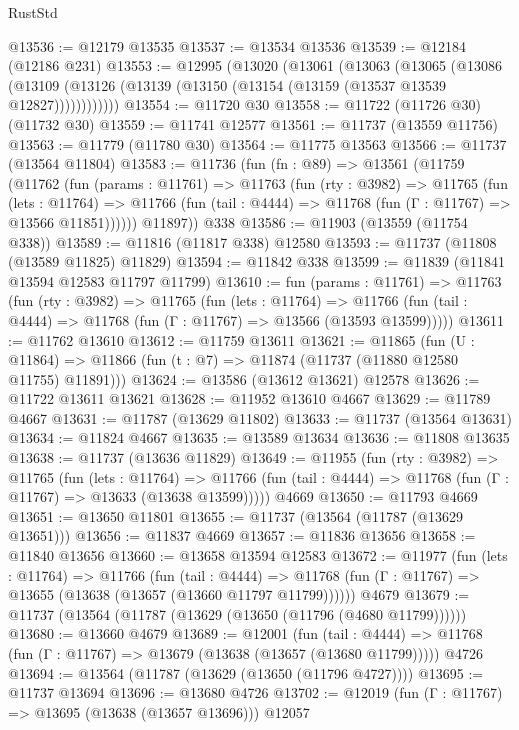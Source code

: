 \begin{lexlean}{RustStd}
\begin{coremodule}
@13536 := @12179 @13535
@13537 := @13534 @13536
@13539 := @12184 (@12186 @231)
@13553 := @12995
    (@13020
      (@13061
        (@13063
          (@13065
            (@13086
              (@13109 (@13126 (@13139 (@13150 (@13154 (@13159 (@13537 @13539 @12827))))))))))))
@13554 := @11720 @30
@13558 := @11722 (@11726 @30) (@11732 @30)
@13559 := @11741 @12577
@13561 := @11737 (@13559 @11756)
@13563 := @11779 (@11780 @30)
@13564 := @11775 @13563
@13566 := @11737 (@13564 @11804)
@13583 := @11736
    (fun (fn : @89) =>
    @13561
      (@11759
        (@11762
          (fun (params : @11761) =>
          @11763
            (fun (rty : @3982) =>
            @11765
              (fun (lets : @11764) =>
              @11766 (fun (tail : @4444) => @11768 (fun (Γ : @11767) => @13566 @11851))))))
        @11897))
    @338
@13586 := @11903 (@13559 (@11754 @338))
@13589 := @11816 (@11817 @338) @12580
@13593 := @11737 (@11808 (@13589 @11825) @11829)
@13594 := @11842 @338
@13599 := @11839 (@11841 @13594 @12583 @11797 @11799)
@13610 := fun (params : @11761) =>
  @11763
    (fun (rty : @3982) =>
    @11765
      (fun (lets : @11764) =>
      @11766 (fun (tail : @4444) => @11768 (fun (Γ : @11767) => @13566 (@13593 @13599)))))
@13611 := @11762 @13610
@13612 := @11759 @13611
@13621 := @11865
    (fun (U : @11864) => @11866 (fun (t : @7) => @11874 (@11737 (@11880 @12580 @11755) @11891)))
@13624 := @13586 (@13612 @13621) @12578
@13626 := @11722 @13611 @13621
@13628 := @11952 @13610 @4667
@13629 := @11789 @4667
@13631 := @11787 (@13629 @11802)
@13633 := @11737 (@13564 @13631)
@13634 := @11824 @4667
@13635 := @13589 @13634
@13636 := @11808 @13635
@13638 := @11737 (@13636 @11829)
@13649 := @11955
    (fun (rty : @3982) =>
    @11765
      (fun (lets : @11764) =>
      @11766 (fun (tail : @4444) => @11768 (fun (Γ : @11767) => @13633 (@13638 @13599)))))
    @4669
@13650 := @11793 @4669
@13651 := @13650 @11801
@13655 := @11737 (@13564 (@11787 (@13629 @13651)))
@13656 := @11837 @4669
@13657 := @11836 @13656
@13658 := @11840 @13656
@13660 := @13658 @13594 @12583
@13672 := @11977
    (fun (lets : @11764) =>
    @11766
      (fun (tail : @4444) =>
      @11768 (fun (Γ : @11767) => @13655 (@13638 (@13657 (@13660 @11797 @11799))))))
    @4679
@13679 := @11737 (@13564 (@11787 (@13629 (@13650 (@11796 (@4680 @11799))))))
@13680 := @13660 @4679
@13689 := @12001
    (fun (tail : @4444) => @11768 (fun (Γ : @11767) => @13679 (@13638 (@13657 (@13680 @11799)))))
    @4726
@13694 := @13564 (@11787 (@13629 (@13650 (@11796 @4727))))
@13695 := @11737 @13694
@13696 := @13680 @4726
@13702 := @12019 (fun (Γ : @11767) => @13695 (@13638 (@13657 @13696))) @12057

\end{coremodule}
\end{lexlean}
